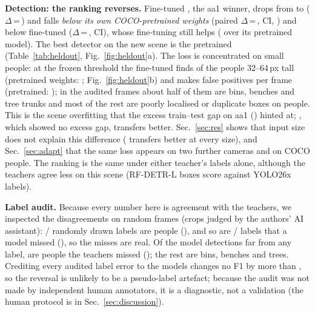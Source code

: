 \textbf{Detection: the ranking reverses.} Fine-tuned \yolo{}, the aa1 winner, drops from \ApYoloFt{} to \HoApYoloFt{} \AP{}
($\Delta$\,=\,\HoDropYoloFt) and falls \emph{below its own COCO-pretrained weights} (paired $\Delta$\,=\,\HoDeltaYoloFtPt,
CI\ci{\HoDeltaLoYoloFtPt}{\HoDeltaHiYoloFtPt}, \TcHoCbbCYoloFtPtP) and below fine-tuned \rfdetr{} ($\Delta$\,=\,\HoDeltaFtFt,
CI\ci{\HoDeltaLoFtFt}{\HoDeltaHiFtFt}), whose fine-tuning still helps (\HoDeltaRfFtPt{} over its pretrained model).
The best detector on the new scene is the pretrained \yolo{} (Table~\ref{tab:heldout}, Fig.~\ref{fig:heldout}a). The
loss is concentrated on small people: at the frozen threshold the fine-tuned \yolo{} finds \HoRecSmallYoloFt{} of the
people 32--64\,px tall (pretrained weights: \HoRecSmallYoloPt; Fig.~\ref{fig:heldout}b) and makes
\HoFppiYoloFt{} false positives per frame (pretrained: \HoFppiYoloPt); in the audited frames about half of them are
bins, benches and tree trunks and most of the rest are poorly localised or duplicate boxes on people.
This is the scene overfitting that the excess train--test gap on aa1 (\ExcessYoloFt) hinted at; \rfdetr{}, which showed
no excess gap, transfers better. Sec.~\ref{sec:res} shows that input size does not explain this difference
(\rfdetr{} transfers better at every size), and Sec.~\ref{sec:adapt} that the same loss appears on two further
cameras and on COCO people. The ranking is the same under either teacher's labels alone, although the teachers
agree less on this scene (RF-DETR-L boxes score \HoTeacherAgree{} \AP{} against YOLO26x labels).

\textbf{Label audit.} Because every number here is agreement with the teachers, we inspected the disagreements on
\HoAuFrames{} random frames (crops judged by the authors' AI assistant): \HoAuLabPerson/\HoAuLabN{} randomly drawn
labels are people (\HoAuLabRate\ci{\HoAuLabLo}{\HoAuLabHi}), and so are \HoAuFnPerson/\HoAuFnN{} labels that a model
missed (\HoAuFnRate), so the misses are real. Of the \HoAuFpN{} model detections far from any label,
\HoAuFpPerson{} are people the teachers missed (\HoAuFpRate\ci{\HoAuFpLo}{\HoAuFpHi}); the rest are bins, benches and
trees. Crediting every audited label error to the models changes no F1 by more than \HoAuMaxFoneShift, so the
reversal is unlikely to be a pseudo-label artefact; because the audit was not made by independent human annotators,
it is a diagnostic, not a validation (the human protocol is in Sec.~\ref{sec:discussion}).

